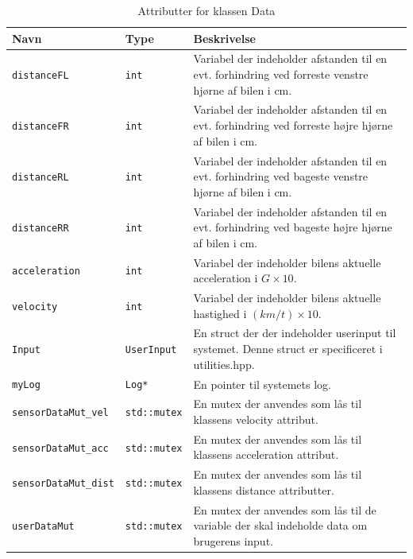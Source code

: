 \begin{table}[h]
\begin{tabularx}{\textwidth}{| Z | Z | L{8cm} |} \hline
Navn & Type & Beskrivelse \\\hline

\texttt{distanceFL} & \texttt{int} &Variabel der indeholder afstanden til en evt. forhindring ved forreste venstre hjørne af bilen i cm.\\\hline

\texttt{distanceFR} & \texttt{int} &Variabel der indeholder afstanden til en evt. forhindring ved forreste højre hjørne af bilen i cm.\\\hline

\texttt{distanceRL} & \texttt{int} &Variabel der indeholder afstanden til en evt. forhindring ved bageste venstre hjørne af bilen i cm.\\\hline

\texttt{distanceRR} & \texttt{int} &Variabel der indeholder afstanden til en evt. forhindring ved bageste højre hjørne af bilen i cm.\\\hline

\texttt{acceleration} & \texttt{int} &Variabel der indeholder bilens aktuelle acceleration i $G \times 10$.\\\hline

\texttt{velocity} & \texttt{int} &Variabel der indeholder bilens aktuelle hastighed i $(km/t)\times 10$.\\\hline

\texttt{Input} & \texttt{UserInput} &En struct der der indeholder userinput til systemet. Denne struct er specificeret i utilities.hpp.\\\hline

\texttt{myLog} & \texttt{Log*} &En pointer til systemets log.\\\hline

\texttt{sensorDataMut\_vel} & \texttt{std::mutex} &En mutex der anvendes som lås til klassens velocity attribut.\\\hline

\texttt{sensorDataMut\_acc} & \texttt{std::mutex} &En mutex der anvendes som lås til klassens acceleration attribut.\\\hline

\texttt{sensorDataMut\_dist} & \texttt{std::mutex} &En mutex der anvendes som lås til klassens distance attributter.\\\hline

\texttt{userDataMut} & \texttt{std::mutex} &En mutex der anvendes som lås til de variable der skal indeholde data om brugerens input.\\\hline

\end{tabularx}
\caption{Attributter for klassen Data}
\label{table:attr_data}
\end{table}

